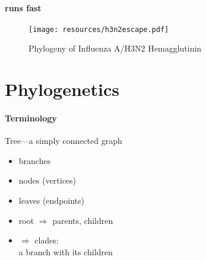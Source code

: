 \documentclass{beamer}
\begin{document}
\begin{darkframes}
    \begin{frame}{\secname}
      \framesubtitle{runs fast}
      \begin{figure}
        \texttt{[image: resources/h3n2escape.pdf]}
        \caption{\footnotesize Phylogeny of Influenza A/H3N2 Hemagglutinin \cite{volzKoelle+13}}
      \end{figure}
    \end{frame}








  \section{Phylogenetics}

    \begin{frame}{\secname}
      \framesubtitle{Terminology}


      Tree---a simply connected graph

      \begin{itemize}
        \item branches

        \item nodes (vertices)

        \item leaves (endpoints)

        \item root $\Rightarrow$ parents, children

        \item {} $\Rightarrow$ clades:\\
        \hspace*{.5cm}a branch with its children


\end{itemize}
\end{frame}
\end{darkframes}
\end{document}
